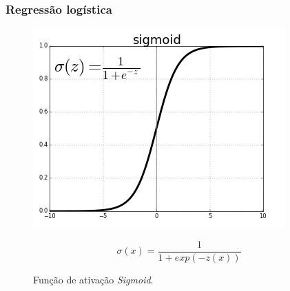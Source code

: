 \documentclass{beamer}
\begin{document}
\begin{frame}
    \frametitle{Regressão logística}
    \begin{figure}[!ht]
        \centering
        \begin{minipage}[c]{0.4\textwidth}
            \includegraphics[width=\columnwidth]{Imagens/sigmoid-activation-function.jpg}
            \caption{Função de ativação \textit{Sigmoid}.}
        \end{minipage}%
        \begin{minipage}{0.5\textwidth}
            \begin{equation} \sigma(x) = \frac{1} {1+ exp(-z(x))}\end{equation}
        \end{minipage}       
        \label{fig:sigmoid}
    \end{figure}
\end{frame}
\end{document}
